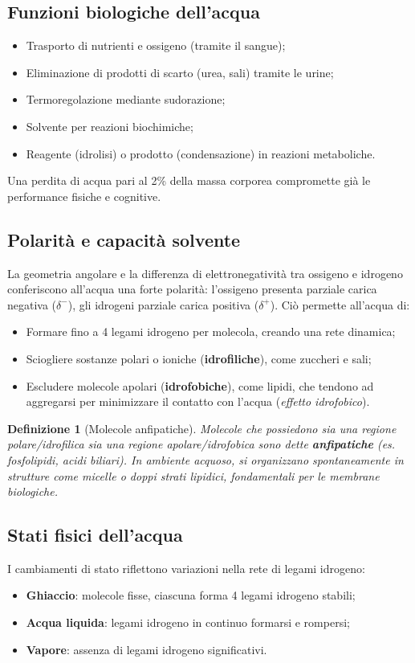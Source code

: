 \documentclass[12pt,a4paper]{report}
\newtheorem{definizione}{Definizione}[section]
\begin{document}
\subsection{Funzioni biologiche dell'acqua}
\begin{itemize}
\item Trasporto di nutrienti e ossigeno (tramite il sangue);
\item Eliminazione di prodotti di scarto (urea, sali) tramite le urine;
\item Termoregolazione mediante sudorazione;
\item Solvente per reazioni biochimiche;
\item Reagente (idrolisi) o prodotto (condensazione) in reazioni metaboliche.
\end{itemize}
Una perdita di acqua pari al 2\% della massa corporea compromette già le performance fisiche e cognitive.
\subsection{Polarità e capacità solvente}
La geometria angolare e la differenza di elettronegatività tra ossigeno e idrogeno conferiscono all'acqua una forte polarità: l'ossigeno presenta parziale carica negativa (\(\delta^-\)), gli idrogeni parziale carica positiva (\(\delta^+\)).
Ciò permette all'acqua di:
\begin{itemize}
\item Formare fino a 4 legami idrogeno per molecola, creando una rete dinamica;
\item Sciogliere sostanze polari o ioniche (\textbf{idrofiliche}), come zuccheri e sali;
\item Escludere molecole apolari (\textbf{idrofobiche}), come lipidi, che tendono ad aggregarsi per minimizzare il contatto con l'acqua (\textit{effetto idrofobico}).
\end{itemize}
\begin{definizione}[Molecole anfipatiche]
Molecole che possiedono sia una regione polare/idrofilica sia una regione apolare/idrofobica sono dette \textbf{anfipatiche} (es. fosfolipidi, acidi biliari). In ambiente acquoso, si organizzano spontaneamente in strutture come micelle o doppi strati lipidici, fondamentali per le membrane biologiche.
\end{definizione}
\subsection{Stati fisici dell'acqua}
I cambiamenti di stato riflettono variazioni nella rete di legami idrogeno:
\begin{itemize}
\item \textbf{Ghiaccio}: molecole fisse, ciascuna forma 4 legami idrogeno stabili;
\item \textbf{Acqua liquida}: legami idrogeno in continuo formarsi e rompersi;
\item \textbf{Vapore}: assenza di legami idrogeno significativi.
\end{itemize}
\end{document}
